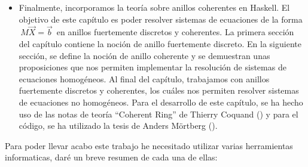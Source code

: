 \begin{itemize}
\item Finalmente, incorporamos la teoría sobre anillos coherentes en Haskell. El objetivo de este capítulo es poder resolver sistemas de ecuaciones de la forma $\,M\vec{X}=\vec{b}\,$ en anillos fuertemente discretos y coherentes. La primera sección del capítulo contiene la noción de anillo fuertemente discreto. En la siguiente sección, se define la noción de anillo coherente y se demuestran unas proposiciones que nos permiten implementar la resolución de sistemas de ecuaciones homogéneos. Al final del capítulo, trabajamos con anillos fuertemente discretos y coherentes, los cuáles nos permiten resolver sistemas de ecuaciones no homogéneos. Para el desarrollo de este capítulo, se ha hecho uso de las notas de teoría ``Coherent Ring'' de Thierry Coquand (\cite{coherent-10}) y para el código, se ha utilizado la tesis de Anders Mörtberg (\cite{tesis}).

\end{itemize}

Para poder llevar acabo este trabajo he necesitado utilizar varias herramientas informaticas, daré un breve resumen de cada una de ellas:\\

